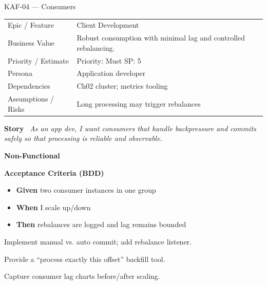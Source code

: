 \documentclass[11pt,a4paper]{article}
\newcommand{\Field}[2]{\textbf{#1}~#2}
\begin{document}
\begin{StoryCardBox}{KAF-04 --- Consumers}
\begin{tabularx}{\linewidth}{LY}
 Epic / Feature & Client Development \\
 Business Value & Robust consumption with minimal lag and controlled rebalancing. \\
 Priority / Estimate & Priority: Must \quad SP: 5 \\
 Persona & Application developer \\
 Dependencies & Ch02 cluster; metrics tooling \\
 Assumptions / Risks & Long processing may trigger rebalances \\
\end{tabularx}

\medskip
\Field{Story}{\; \emph{As an app dev, I want consumers that handle backpressure and commits safely so that processing is reliable and observable.}}

\medskip
\Field{Non-Functional}{\; \; }

\medskip
\Field{Acceptance Criteria (BDD)}{}
\begin{itemize}[leftmargin=1.2em, itemsep=1pt]
  \item \textbf{Given} two consumer instances in one group
  \item \textbf{When} I scale up/down
  \item \textbf{Then} rebalances are logged and lag remains bounded
\end{itemize}

\begin{TasksBox}
\begin{tasklist}
  \item Implement manual vs. auto commit; add rebalance listener.
  \item Provide a ``process exactly this offset'' backfill tool.
  \item Capture consumer lag charts before/after scaling.
\end{tasklist}
\end{TasksBox}
\end{StoryCardBox}
\clearpage
\end{document}
